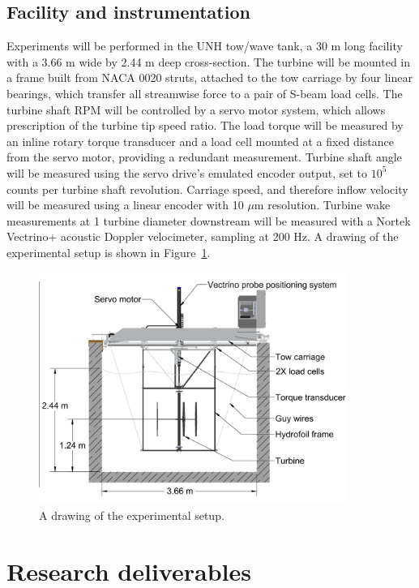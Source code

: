 \documentclass[12pt]{scrreprt}
\begin{document}
\section{Facility and instrumentation}

Experiments will be performed in the UNH tow/wave tank, a 30 m long facility
with a 3.66 m wide by 2.44 m deep cross-section. The turbine will be mounted in
a frame built from NACA 0020 struts, attached to the tow carriage by four linear
bearings, which transfer all streamwise force to a pair of S-beam load cells.
The turbine shaft RPM will be controlled by a servo motor system, which allows
prescription of the turbine tip speed ratio. The load torque will be measured by
an inline rotary torque transducer and a load cell mounted at a fixed distance
from the servo motor, providing a redundant measurement. Turbine shaft angle
will be measured using the servo drive's emulated encoder output, set to $10^5$
counts per turbine shaft revolution. Carriage speed, and therefore inflow
velocity will be measured using a linear encoder with 10 $\mu$m resolution.
Turbine wake measurements at 1 turbine diameter downstream will be measured with
a Nortek Vectrino+ acoustic Doppler velocimeter, sampling at 200 Hz. A drawing
of the experimental setup is shown in Figure~\ref{fig-exp_setup}.

\begin{figure}[ht]
\centering
\includegraphics[width=0.9\textwidth]{Figures/tank_cross_section}
\caption{A drawing of the experimental setup.}
\label{fig-exp_setup}
\end{figure}


\chapter{Research deliverables}
\end{document}
